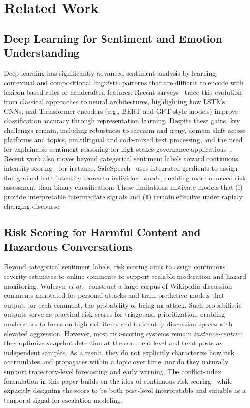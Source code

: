 \documentclass[journal]{IEEEtran}
\begin{document}
\section{Related Work}

\subsection{Deep Learning for Sentiment and Emotion Understanding}
Deep learning has significantly advanced sentiment analysis by learning contextual and compositional linguistic patterns that are difficult to encode with lexicon-based rules or handcrafted features. Recent surveys~\cite{birjali2021sentiment,wahid2025crisis} trace this evolution from classical approaches to neural architectures, highlighting how LSTMs, CNNs, and Transformer encoders (e.g., BERT and GPT-style models) improve classification accuracy through representation learning. Despite these gains, key challenges remain, including robustness to sarcasm and irony, domain shift across platforms and topics, multilingual and code-mixed text processing, and the need for explainable sentiment reasoning for high-stakes governance applications~\cite{birjali2021sentiment}. Recent work also moves beyond categorical sentiment labels toward continuous intensity scoring---for instance, SafeSpeech~\cite{ghosh2024safespeech} uses integrated gradients to assign fine-grained hate-intensity scores to individual words, enabling more nuanced risk assessment than binary classification. These limitations motivate models that (i) provide interpretable intermediate signals and (ii) remain effective under rapidly changing discourse.

\subsection{Risk Scoring for Harmful Content and Hazardous Conversations}
Beyond categorical sentiment labels, risk scoring aims to assign continuous severity estimates to online comments to support scalable moderation and hazard monitoring. Wulczyn \emph{et al.}~\cite{Wulczyn2017} construct a large corpus of Wikipedia discussion comments annotated for personal attacks and train predictive models that output, for each comment, the probability of being an attack. Such probabilistic outputs serve as practical risk scores for triage and prioritization, enabling moderators to focus on high-risk items and to identify discussion spaces with elevated aggression. However, most risk-scoring systems remain \emph{instance-centric}: they optimize snapshot detection at the comment level and treat posts as independent samples. As a result, they do not explicitly characterize how risk accumulates and propagates within a topic over time, nor do they naturally support trajectory-level forecasting and early warning. The conflict-index formulation in this paper builds on the idea of continuous risk scoring~\cite{ghosh2024safespeech} while explicitly designing the score to be both post-level interpretable and suitable as a temporal signal for escalation modeling.
\end{document}
